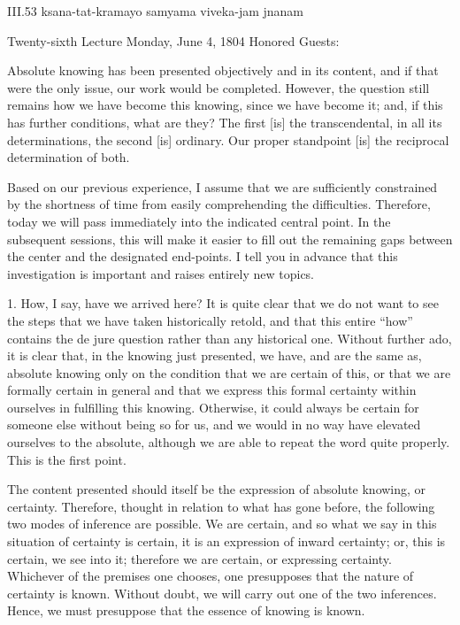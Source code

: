  III.53
ksana-tat-kramayo samyama viveka-jam jnanam

Twenty-sixth Lecture
Monday, June 4, 1804
Honored Guests:

Absolute knowing has been presented
objectively and in its content,
and if that were the only issue,
our work would be completed.
However, the question still remains
how we have become this knowing,
since we have become it;
and, if this has further conditions,
what are they?
The first [is] the transcendental,
in all its determinations,
the second [is] ordinary.
Our proper standpoint [is]
the reciprocal determination of both.

Based on our previous experience,
I assume that we are sufficiently
constrained by the shortness of time
from easily comprehending the difficulties.
Therefore, today we will pass immediately
into the indicated central point.
In the subsequent sessions,
this will make it easier to fill out
the remaining gaps between the center
and the designated end-points.
I tell you in advance that
this investigation is important
and raises entirely new topics.

1. How, I say, have we arrived here?
It is quite clear that we do not want
to see the steps that we have taken historically retold,
and that this entire “how” contains the de jure question
rather than any historical one.
Without further ado, it is clear that,
in the knowing just presented,
we have, and are the same as, absolute knowing
only on the condition that we are certain of this,
or that we are formally certain in general
and that we express this formal certainty
within ourselves in fulfilling this knowing.
Otherwise, it could always be certain
for someone else without being so for us,
and we would in no way have elevated
ourselves to the absolute,
although we are able to
repeat the word quite properly.
This is the first point.

The content presented should itself be
the expression of absolute knowing, or certainty.
Therefore, thought in relation to what has gone before,
the following two modes of inference are possible.
We are certain, and so what we say
in this situation of certainty is certain,
it is an expression of inward certainty;
or, this is certain, we see into it;
therefore we are certain, or expressing certainty.
Whichever of the premises one chooses,
one presupposes that the nature of certainty is known.
Without doubt, we will carry out one of the two inferences.
Hence, we must presuppose that the essence of knowing is known.

